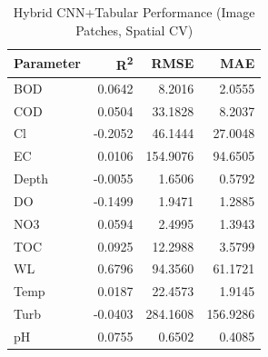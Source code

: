 \begin{table}[htbp]
\centering
\caption{Hybrid CNN+Tabular Performance (Image Patches, Spatial CV)}
\label{tab:cnn_results}
\begin{tabular}{lrrr}
\hline
\textbf{Parameter} & \textbf{R\textsuperscript{2}} & \textbf{RMSE} & \textbf{MAE} \\
\hline
  BOD & 0.0642 & 8.2016 & 2.0555 \\
  COD & 0.0504 & 33.1828 & 8.2037 \\
  Cl & -0.2052 & 46.1444 & 27.0048 \\
  EC & 0.0106 & 154.9076 & 94.6505 \\
  Depth & -0.0055 & 1.6506 & 0.5792 \\
  DO & -0.1499 & 1.9471 & 1.2885 \\
  NO3 & 0.0594 & 2.4995 & 1.3943 \\
  TOC & 0.0925 & 12.2988 & 3.5799 \\
  WL & 0.6796 & 94.3560 & 61.1721 \\
  Temp & 0.0187 & 22.4573 & 1.9145 \\
  Turb & -0.0403 & 284.1608 & 156.9286 \\
  pH & 0.0755 & 0.6502 & 0.4085 \\
\hline
\end{tabular}
\end{table}
